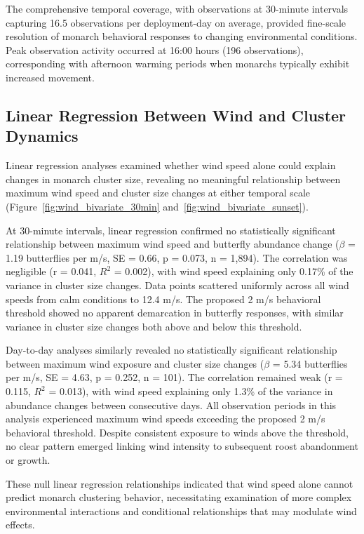 The comprehensive temporal coverage, with observations at 30-minute intervals capturing 16.5 observations per deployment-day on average, provided fine-scale resolution of monarch behavioral responses to changing environmental conditions. Peak observation activity occurred at 16:00 hours (196 observations), corresponding with afternoon warming periods when monarchs typically exhibit increased movement.

\subsection{Linear Regression Between Wind and Cluster Dynamics}

Linear regression analyses examined whether wind speed alone could explain changes in monarch cluster size, revealing no meaningful relationship between maximum wind speed and cluster size changes at either temporal scale (Figure~\ref{fig:wind_bivariate_30min} and~\ref{fig:wind_bivariate_sunset}).

At 30-minute intervals, linear regression confirmed no statistically significant relationship between maximum wind speed and butterfly abundance change ($\beta$ = 1.19 butterflies per m/s, SE = 0.66, p = 0.073, n = 1,894). The correlation was negligible (r = 0.041, $R^2$ = 0.002), with wind speed explaining only 0.17\% of the variance in cluster size changes. Data points scattered uniformly across all wind speeds from calm conditions to 12.4 m/s. The proposed 2 m/s behavioral threshold showed no apparent demarcation in butterfly responses, with similar variance in cluster size changes both above and below this threshold.

Day-to-day analyses similarly revealed no statistically significant relationship between maximum wind exposure and cluster size changes ($\beta$ = 5.34 butterflies per m/s, SE = 4.63, p = 0.252, n = 101). The correlation remained weak (r = 0.115, $R^2$ = 0.013), with wind speed explaining only 1.3\% of the variance in abundance changes between consecutive days. All observation periods in this analysis experienced maximum wind speeds exceeding the proposed 2 m/s behavioral threshold. Despite consistent exposure to winds above the threshold, no clear pattern emerged linking wind intensity to subsequent roost abandonment or growth.

These null linear regression relationships indicated that wind speed alone cannot predict monarch clustering behavior, necessitating examination of more complex environmental interactions and conditional relationships that may modulate wind effects.


